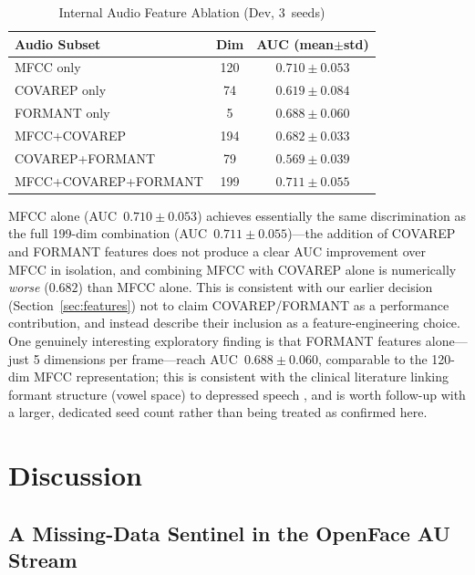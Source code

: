 \documentclass[5p,twocolumn]{elsarticle}
\begin{document}
\begin{table}[t]
\centering
\renewcommand{\arraystretch}{1.15}
\caption{Internal Audio Feature Ablation (Dev, 3~seeds)}
\label{tab:audio_ablation}
\scriptsize
\begin{tabular}{lcc}
\toprule
\textbf{Audio Subset} & \textbf{Dim} & \textbf{AUC (mean$\pm$std)} \\
\midrule
MFCC only              & 120 & $0.710\pm0.053$ \\
COVAREP only           &  74 & $0.619\pm0.084$ \\
FORMANT only           &   5 & $0.688\pm0.060$ \\
MFCC+COVAREP           & 194 & $0.682\pm0.033$ \\
COVAREP+FORMANT        &  79 & $0.569\pm0.039$ \\
MFCC+COVAREP+FORMANT   & 199 & $0.711\pm0.055$ \\
\bottomrule
\end{tabular}
\end{table}

MFCC alone (AUC~$0.710\pm0.053$) achieves essentially the same
discrimination as the full 199-dim combination
(AUC~$0.711\pm0.055$)---the addition of COVAREP and FORMANT features
does not produce a clear AUC improvement over MFCC in isolation, and
combining MFCC with COVAREP alone is numerically \emph{worse}
($0.682$) than MFCC alone. This is consistent with our earlier
decision (Section~\ref{sec:features}) not to claim COVAREP/FORMANT as
a performance contribution, and instead describe their inclusion as a
feature-engineering choice. One genuinely interesting exploratory
finding is that FORMANT features alone---just 5 dimensions per
frame---reach AUC~$0.688\pm0.060$, comparable to the 120-dim MFCC
representation; this is consistent with the clinical literature
linking formant structure (vowel space) to depressed speech
\cite{scherer2016vowel}, and is worth follow-up with a larger, dedicated
seed count rather than being treated as confirmed here.

\section{Discussion}
\label{sec:discussion}

\subsection{A Missing-Data Sentinel in the OpenFace AU Stream}
\label{sec:sentinel}
\end{document}
